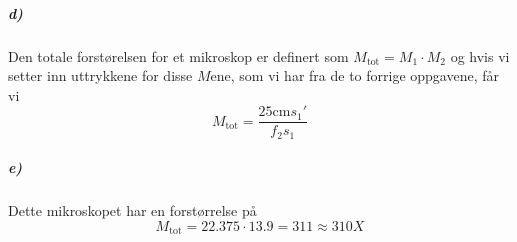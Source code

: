 \documentclass[11pt, A4paper,norsk]{article}
\begin{document}
			\subparagraph{d)}
				\begin{flushleft}
Den totale forstørelsen for et mikroskop er definert som $M_{\text{tot}} = M_1 \cdot M_2$ og hvis vi setter inn uttrykkene for disse $M$ene, som vi har fra de to forrige oppgavene, får vi
$$M_{\text{tot}} = \frac{25 \text{cm} s_1'}{f_2 s_1}$$
				\end{flushleft}










			\subparagraph{e)}
				\begin{flushleft}
Dette mikroskopet har en forstørrelse på
$$M_{\text{tot}} = 22.375 \cdot 13.9 = 311 \approx 310 X$$
				\end{flushleft}
\end{document}
